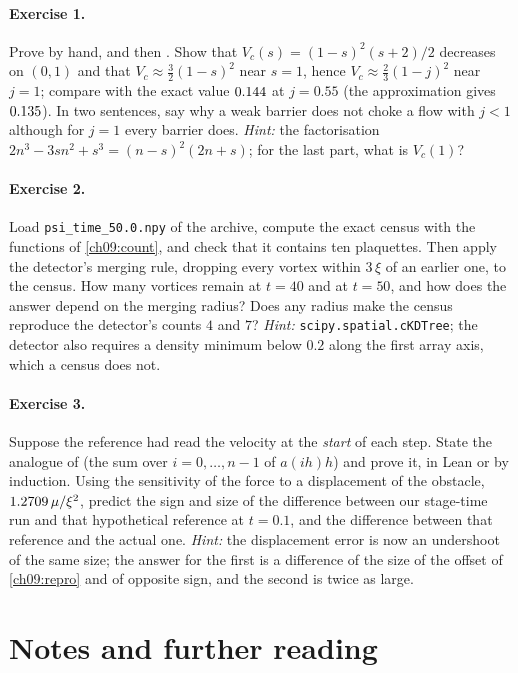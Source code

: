 \paragraph{Exercise 1.} Prove  by hand, and then . Show that $V_c(s)=(1-s)^2(s+2)/2$ decreases on $(0,1)$ and that $V_c\approx\tfrac32(1-s)^2$ near $s=1$, hence $V_c\approx\tfrac23(1-j)^2$ near $j=1$; compare with the exact value $0.144$ at $j=0.55$ (the approximation gives $0.135$). In two sentences, say why a weak barrier does not choke a flow with $j<1$ although for $j=1$ every barrier does. \emph{Hint:} the factorisation $2n^3-3sn^2+s^3=(n-s)^2(2n+s)$; for the last part, what is $V_c(1)$?

\paragraph{Exercise 2.} Load \texttt{psi\_time\_50.0.npy} of the archive, compute the exact census with the functions of \cref{ch09:count}, and check that it contains ten plaquettes. Then apply the detector's merging rule, dropping every vortex within $3\,\xi$ of an earlier one, to the census. How many vortices remain at $t=40$ and at $t=50$, and how does the answer depend on the merging radius? Does any radius make the census reproduce the detector's counts $4$ and $7$? \emph{Hint:} \texttt{scipy.spatial.cKDTree}; the detector also requires a density minimum below $0.2$ along the first array axis, which a census does not.

\paragraph{Exercise 3.} Suppose the reference had read the velocity at the \emph{start} of each step. State the analogue of  (the sum over $i=0,\dots,n-1$ of $a(ih)h$) and prove it, in Lean or by induction. Using the sensitivity of the force to a displacement of the obstacle, $1.2709\,\mu/\xi^2$, predict the sign and size of the difference between our stage-time run and that hypothetical reference at $t=0.1$, and the difference between that reference and the actual one. \emph{Hint:} the displacement error is now an undershoot of the same size; the answer for the first is a difference of the size of the offset of \cref{ch09:repro} and of opposite sign, and the second is twice as large.

\section{Notes and further reading}\label{ch09:notes}

